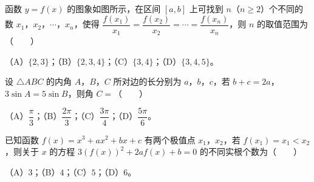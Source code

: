 \begin{question}
函数 $y=f(x)$ 的图象如图所示，在区间 $[a,b]$ 上可找到 $n$（$n\geqslant2$）个不同的数 $x_1$，$x_2$，$\cdots$，$x_n$，使得 $\dfrac{f(x_1)}{x_1}=\dfrac{f(x_2)}{x_2}=\cdots=\dfrac{f(x_n)}{x_n}$，则 $n$ 的取值范围为\mbox{（　　）}
\nopagebreak[4]
\begin{center}\end{center}
\nopagebreak[4]
（A）$\{2,3\}$；（B）$\{2,3,4\}$；（C）$\{3,4\}$；（D）$\{3,4,5\}$。

\end{question}
\begin{question}
设 $\triangle ABC$ 的内角 $A$，$B$，$C$ 所对边的长分别为 $a$，$b$，$c$，若 $b+c=2a$，$3\sin A=5\sin B$，则角 $C=$\mbox{（　　）}

（A）$\dfrac\pi3$；（B）$\dfrac{2\pi}3$；（C）$\dfrac{3\pi}4$；（D）$\dfrac{5\pi}6$。

\end{question}
\begin{question}
已知函数 $f(x)=x^3+ax^2+bx+c$ 有两个极值点 $x_1$，$x_2$，若 $f(x_1)=x_1<x_2$，则关于 $x$ 的方程 $3(f(x))^2+2af(x)+b=0$ 的不同实根个数为\mbox{（　　）}

（A）$3$；（B）$4$；（C）$5$；（D）$6$。

\end{question}

